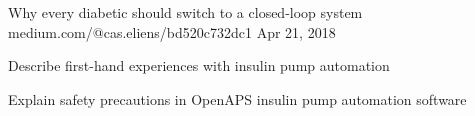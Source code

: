 

\begin{cventries}


  \cventry
    {} %
    {Why every diabetic should switch to a closed-loop system} %
    {medium.com/@cas.eliens/bd520c732dc1} %
    {Apr 21, 2018} %
    {
      \begin{cvitems} %
        \item {Describe first-hand experiences with insulin pump automation}
        \item {Explain safety precautions in OpenAPS insulin pump automation software}
      \end{cvitems}
    }

\end{cventries}
